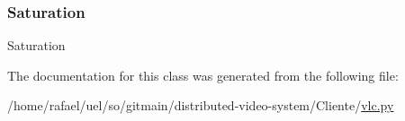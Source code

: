 \mbox{\label{classvlc_1_1_video_adjust_option_a276a75a8a6d37e9cec3f23eb0e2dc517}} 
\subsubsection{\texorpdfstring{Saturation}{Saturation}}
{\footnotesize\ttfamily Saturation\hspace{0.3cm}{\ttfamily [static]}}



The documentation for this class was generated from the following file\+:\begin{DoxyCompactItemize}
\item 
/home/rafael/uel/so/gitmain/distributed-\/video-\/system/\+Cliente/\hyperlink{vlc_8py}{vlc.\+py}\end{DoxyCompactItemize}

